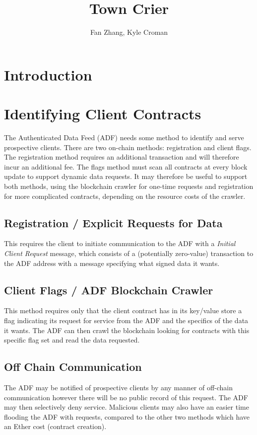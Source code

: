 \documentclass{article}
\title{Town Crier}
\author{Fan Zhang, Kyle Croman}
\begin{document}
\maketitle

\section{Introduction}

\section{Identifying Client Contracts}
The Authenticated Data Feed (ADF) needs some method to identify and serve prospective clients.  There are two on-chain methods: registration and client flags.  The registration method requires an additional transaction and will therefore incur an additional fee.  The flags method must scan all contracts at every block update to support dynamic data requests.  It may therefore be useful to support both methods, using the blockchain crawler for one-time requests and registration for more complicated contracts, depending on the resource costs of the crawler.
\subsection{Registration / Explicit Requests for Data}
	This requires the client to initiate communication to the ADF with a \emph{Initial Client Request} message, which consists of a (potentially zero-value) transaction to the ADF address with a message specifying what signed data it wants. 
	
\subsection{Client Flags / ADF Blockchain Crawler}
	This method requires only that the client contract has in its key/value store a flag indicating its request for service from the ADF and the specifics of the data it wants.  The ADF can then crawl the blockchain looking for contracts with this specific flag set and read the data requested.
	
\subsection{Off Chain Communication}
	The ADF may be notified of prospective clients by any manner of off-chain communication however there will be no public record of this request.  The ADF may then selectively deny service.  Malicious clients may also have an easier time flooding the ADF with requests, compared to the other two methods which have an Ether cost (contract creation).\\
\end{document}
